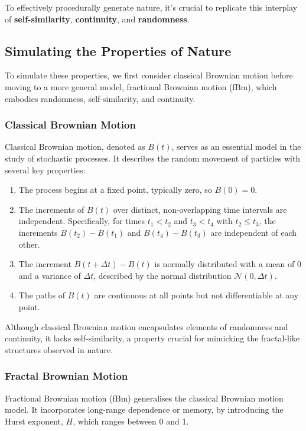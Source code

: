 To effectively procedurally generate nature, it's crucial to replicate this interplay of \textbf{self-similarity}, \textbf{continuity}, and \textbf{randomness}.

\subsection{Simulating the Properties of Nature}

To simulate these properties, we first consider classical Brownian motion before moving to a more general model, fractional Brownian motion (fBm), which embodies randomness, self-similarity, and continuity.

\subsubsection{Classical Brownian Motion}

Classical Brownian motion, denoted as $B(t)$, serves as an essential model in the study of stochastic processes. It describes the random movement of particles with several key properties:

\begin{enumerate}
    \item The process begins at a fixed point, typically zero, so $B(0) = 0$.
    \item  The increments of $B(t)$ over distinct, non-overlapping time intervals are independent. Specifically, for times $t_1 < t_2$ and $t_3 < t_4$ with $t_2 \leq t_3$, the increments $B(t_2) - B(t_1)$ and $B(t_4) - B(t_3)$ are independent of each other.
    \item The increment $B(t + \Delta t) - B(t)$ is normally distributed with a mean of 0 and a variance of $\Delta t$, described by the normal distribution $\mathcal{N}(0, \Delta t)$.
    \item The paths of $B(t)$ are continuous at all points but not differentiable at any point.
\end{enumerate}

Although classical Brownian motion encapsulates elements of randomness and continuity, it lacks self-similarity, a property crucial for mimicking the fractal-like structures observed in nature. 

\subsubsection{Fractal Brownian Motion}
\label{FBM}

Fractional Brownian motion (fBm) generalises the classical Brownian motion model. It incorporates long-range dependence or memory,  by introducing the Hurst exponent, $H$, which ranges between 0 and 1. 

